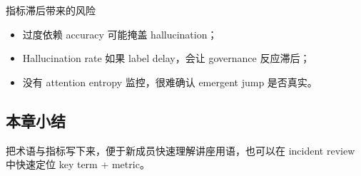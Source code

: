 \begin{warningbox}{指标滞后带来的风险}
\begin{itemize}
    \item 过度依赖 accuracy 可能掩盖 hallucination；
    \item Hallucination rate 如果 label delay，会让 governance 反应滞后；
    \item 没有 attention entropy 监控，很难确认 emergent jump 是否真实。
\end{itemize}
\end{warningbox}

\subsection{本章小结}

把术语与指标写下来，便于新成员快速理解讲座用语，也可以在 incident review 中快速定位 key term + metric。

